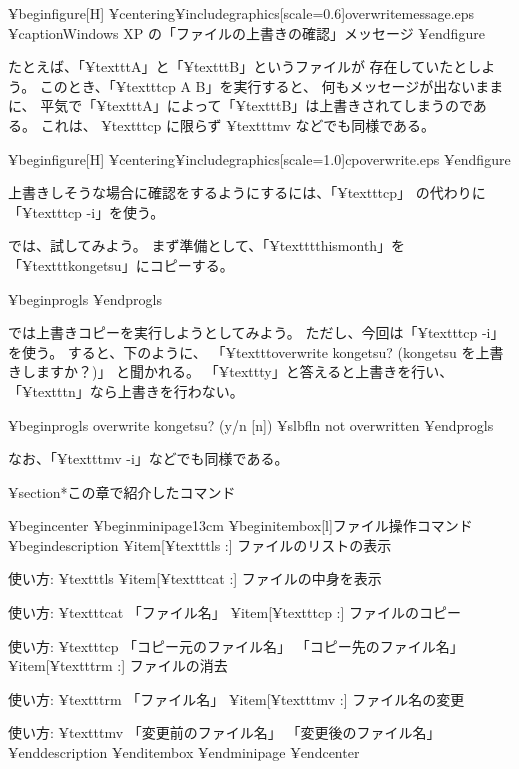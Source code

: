 ¥begin{figure}[H]
¥centering{¥includegraphics[scale=0.6]{overwritemessage.eps}}
¥caption{Windows XP の「ファイルの上書きの確認」メッセージ}
¥end{figure}

たとえば、「¥texttt{A}」と「¥texttt{B}」というファイルが
存在していたとしよう。
このとき、「¥texttt{cp A B}」を実行すると、
何もメッセージが出ないままに、
平気で「¥texttt{A}」によって「¥texttt{B}」は上書きされてしまうのである。
これは、 ¥texttt{cp} に限らず ¥texttt{mv} などでも同様である。

¥begin{figure}[H]
¥centering{¥includegraphics[scale=1.0]{cpoverwrite.eps}}
¥end{figure}

上書きしそうな場合に確認をするようにするには、「¥texttt{cp}」
の代わりに「¥texttt{cp -i}」を使う。

では、試してみよう。
まず準備として、「¥texttt{thismonth}」を「¥texttt{kongetsu}」にコピーする。

¥begin{progls}
%
¥end{progls}

では上書きコピーを実行しようとしてみよう。
ただし、今回は「¥texttt{cp -i}」を使う。
すると、下のように、
「¥texttt{overwrite kongetsu? (kongetsu を上書きしますか？)}」
と聞かれる。
「¥texttt{y}」と答えると上書きを行い、「¥texttt{n}」なら上書きを行わない。

¥begin{progls}
overwrite kongetsu? (y/n [n]) ¥slbfl{n}
not overwritten
%
¥end{progls}

なお、「¥texttt{mv -i}」などでも同様である。

¥section*{この章で紹介したコマンド}

¥begin{center}
¥begin{minipage}{13cm}
¥begin{itembox}[l]{ファイル操作コマンド}
¥begin{description}
¥item[¥texttt{ls} :] ファイルのリストの表示

使い方: ¥texttt{ls}
¥item[¥texttt{cat} :] ファイルの中身を表示

使い方: ¥texttt{cat} 「ファイル名」
¥item[¥texttt{cp} :] ファイルのコピー

使い方: ¥texttt{cp} 「コピー元のファイル名」 「コピー先のファイル名」
¥item[¥texttt{rm} :] ファイルの消去

使い方: ¥texttt{rm} 「ファイル名」
¥item[¥texttt{mv} :] ファイル名の変更

使い方: ¥texttt{mv} 「変更前のファイル名」 「変更後のファイル名」
¥end{description}
¥end{itembox}
¥end{minipage}
¥end{center}

